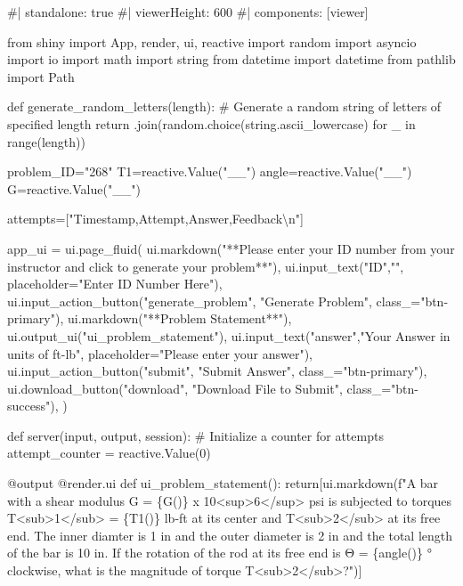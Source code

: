 \documentclass[
  letterpaper,
  DIV=11,
  numbers=noendperiod]{scrreprt}
\newenvironment{Shaded}{\begin{snugshade}}{\end{snugshade}}
\newcommand{\NormalTok}[1]{\textcolor[rgb]{0.00,0.23,0.31}{#1}}
\begin{document}
\begin{Shaded}
\begin{Highlighting}[]
\NormalTok{\#| standalone: true}
\NormalTok{\#| viewerHeight: 600}
\NormalTok{\#| components: [viewer]}

\NormalTok{from shiny import App, render, ui, reactive}
\NormalTok{import random}
\NormalTok{import asyncio}
\NormalTok{import io}
\NormalTok{import math}
\NormalTok{import string}
\NormalTok{from datetime import datetime}
\NormalTok{from pathlib import Path}

\NormalTok{def generate\_random\_letters(length):}
\NormalTok{    \# Generate a random string of letters of specified length}
\NormalTok{    return \textquotesingle{}\textquotesingle{}.join(random.choice(string.ascii\_lowercase) for \_ in range(length)) }

\NormalTok{problem\_ID="268"}
\NormalTok{T1=reactive.Value("\_\_")}
\NormalTok{angle=reactive.Value("\_\_")}
\NormalTok{G=reactive.Value("\_\_")}

\NormalTok{attempts=["Timestamp,Attempt,Answer,Feedback\textbackslash{}n"]}

\NormalTok{app\_ui = ui.page\_fluid(}
\NormalTok{    ui.markdown("**Please enter your ID number from your instructor and click to generate your problem**"),}
\NormalTok{    ui.input\_text("ID","", placeholder="Enter ID Number Here"),}
\NormalTok{    ui.input\_action\_button("generate\_problem", "Generate Problem", class\_="btn{-}primary"),}
\NormalTok{    ui.markdown("**Problem Statement**"),}
\NormalTok{    ui.output\_ui("ui\_problem\_statement"),}
\NormalTok{    ui.input\_text("answer","Your Answer in units of ft{-}lb", placeholder="Please enter your answer"),}
\NormalTok{    ui.input\_action\_button("submit", "Submit Answer", class\_="btn{-}primary"),}
\NormalTok{    ui.download\_button("download", "Download File to Submit", class\_="btn{-}success"),}
\NormalTok{)}


\NormalTok{def server(input, output, session):}
\NormalTok{    \# Initialize a counter for attempts}
\NormalTok{    attempt\_counter = reactive.Value(0)}

\NormalTok{    @output}
\NormalTok{    @render.ui}
\NormalTok{    def ui\_problem\_statement():}
\NormalTok{        return[ui.markdown(f"A bar with a shear modulus G = \{G()\} x 10\textless{}sup\textgreater{}6\textless{}/sup\textgreater{} psi is subjected to torques T\textless{}sub\textgreater{}1\textless{}/sub\textgreater{} = \{T1()\} lb{-}ft at its center and T\textless{}sub\textgreater{}2\textless{}/sub\textgreater{} at its free end. The inner diamter is 1 in and the outer diameter is 2 in and the total length of the bar is 10 in. If the rotation of the rod at its free end is Θ =  \{angle()\} ° clockwise, what is the magnitude of torque T\textless{}sub\textgreater{}2\textless{}/sub\textgreater{}?")]}
    

\end{Highlighting}
\end{Shaded}
\end{document}
